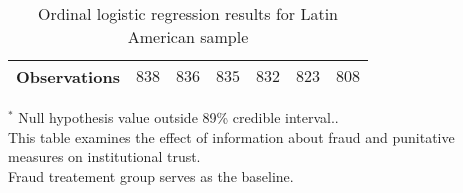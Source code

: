 \begin{table}
\begin{center}
\begin{threeparttable}
\begin{tabular}{l c c c c c c}
\hline
Observations        & $838$             & $836$             & $835$             & $832$             & $823$             & $808$             \\
\hline
\end{tabular}
\begin{tablenotes}[flushleft]
\scriptsize{$^*$ Null hypothesis value outside 89\% credible interval..  \\
This table examines the effect of information about fraud
                      and punitative measures on institutional trust. \\
Fraud treatement group serves as the baseline.}
\end{tablenotes}
\end{threeparttable}
\caption{Ordinal logistic regression results for Latin American sample}
\label{table:coefficients}
\end{center}
\end{table}
